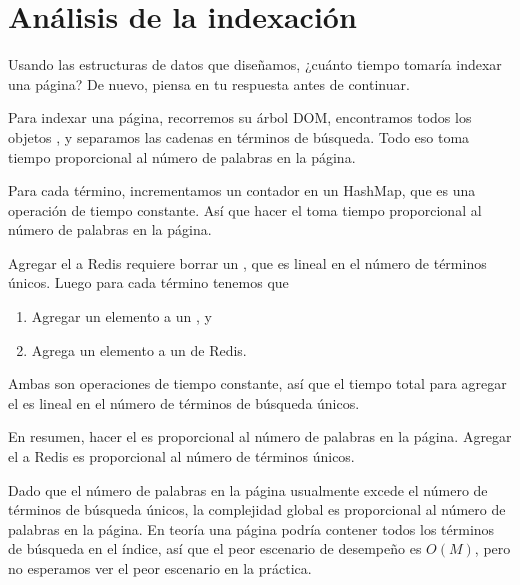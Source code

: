\documentclass[12pt]{book}
\theoremstyle{exercise}
\begin{document}
\section{Análisis de la indexación}
\label{analysis-of-indexing}

Usando las estructuras de datos que diseñamos, ¿cuánto tiempo tomaría
indexar una página? De nuevo, piensa en tu respuesta antes de continuar.


Para indexar una página, recorremos su árbol DOM, encontramos todos los
objetos , y separamos las cadenas en términos de búsqueda.
Todo eso toma tiempo proporcional al número de palabras en la página.


Para cada término, incrementamos un contador en un HashMap, que es una
operación de tiempo constante. Así que hacer el  toma
tiempo proporcional al número de palabras en la página.


Agregar el  a Redis requiere borrar un
, que es lineal en el número de términos únicos.
Luego para cada término tenemos que

\begin{enumerate}

\item
  Agregar un elemento a un , y

\item
  Agrega un elemento a un  de Redis.

\end{enumerate}

Ambas son operaciones de tiempo constante, así que el tiempo total para
agregar el  es lineal en el número de términos de búsqueda únicos.


En resumen, hacer el  es proporcional al número
de palabras en la página. Agregar el  a Redis
es proporcional al número de términos únicos.


Dado que el número de palabras en la página usualmente excede el número de
términos de búsqueda únicos, la complejidad global es proporcional al
número de palabras en la página. En teoría una página podría contener
todos los términos de búsqueda en el índice, así que el peor escenario de
desempeño es $O(M)$, pero no esperamos ver el peor escenario en la práctica.
\end{document}
